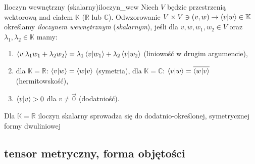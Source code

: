 \documentclass{article}
\newcommand\R{\mathbb{R}}
\begin{document}
\begin{dfn}{Iloczyn wewnętrzny (skalarny)}{iloczyn_wew}
  Niech $V$ będzie przestrzenią wektorową nad ciałem $\mathbb{K}$ ($\R$ lub $\mathbb{C}$). Odwzorowanie $V\times V\ni(v,w)\to\braket{v}{w}\in\mathbb{K}$ określamy \textit{iloczynem wewnętrznym} (\textit{skalarnym}), jeśli dla $v, w, w_1, w_2\in V$ oraz $\lambda_1, \lambda_2\in\mathbb{K}$ mamy:
  \begin{enumerate}
    \item $\braket{v}{\lambda_1 w_1 + \lambda_2 w_2} = \lambda_1\braket{v}{w_1} + \lambda_2\braket{v}{w_2}$ (liniowość w drugim argumencie),
    \item dla $\mathbb{K}=\R$:  $\braket{v}{w}=\braket{w}{v}$ (symetria),
          dla $\mathbb{K}=\mathbb{C}$: $\braket{v}{w}=\overline{\braket{w}{v}}$ (hermitowskość),
    \item $\braket{v}{v}>0$ dla $v\neq\vec{0}$ (dodatniość).
  \end{enumerate}
  Dla $\mathbb{K}=\R$ iloczyn skalarny sprowadza się do dodatnio-określonej, symetrycznej formy dwuliniowej 
\end{dfn}

















\subsection{tensor metryczny, forma objętości}\label{sec:tensor_metryczny_vol}
\end{document}
